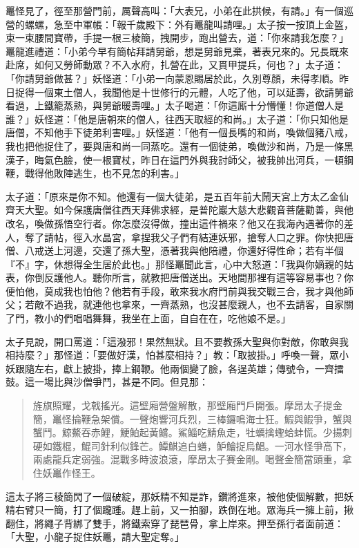 鼉怪見了，徑至那營門前，厲聲高叫：「大表兄，小弟在此拱候，有請。」有一個巡營的螺螺，急至中軍帳：「報千歲殿下：外有鼉龍叫請哩。」太子按一按頂上金盔，束一束腰間寶帶，手提一根三棱簡，拽開步，跑出營去，道：「你來請我怎麼？」鼉龍進禮道：「小弟今早有簡帖拜請舅爺，想是舅爺見棄，著表兄來的。兄長既來赴席，如何又勞師動眾？不入水府，扎營在此，又貫甲提兵，何也？」太子道：「你請舅爺做甚？」妖怪道：「小弟一向蒙恩賜居於此，久別尊顏，未得孝順。昨日捉得一個東土僧人，我聞他是十世修行的元體，人吃了他，可以延壽，欲請舅爺看過，上鐵籠蒸熟，與舅爺暖壽哩。」太子喝道：「你這廝十分懵懂！你道僧人是誰？」妖怪道：「他是唐朝來的僧人，往西天取經的和尚。」太子道：「你只知他是唐僧，不知他手下徒弟利害哩。」妖怪道：「他有一個長嘴的和尚，喚做個豬八戒，我也把他捉住了，要與唐和尚一同蒸吃。還有一個徒弟，喚做沙和尚，乃是一條黑漢子，晦氣色臉，使一根寶杖，昨日在這門外與我討師父，被我帥出河兵，一頓鋼鞭，戰得他敗陣逃生，也不見怎的利害。」

太子道：「原來是你不知。他還有一個大徒弟，是五百年前大鬧天宮上方太乙金仙齊天大聖。如今保護唐僧往西天拜佛求經，是普陀巖大慈大悲觀音菩薩勸善，與他改名，喚做孫悟空行者。你怎麼沒得做，撞出這件禍來？他又在我海內遇著你的差人，奪了請帖，徑入水晶宮，拿捏我父子們有結連妖邪，搶奪人口之罪。你快把唐僧、八戒送上河邊，交還了孫大聖，憑著我與他陪禮，你還好得性命；若有半個『不』字，休想得全生居於此也。」那怪鼉聞此言，心中大怒道：「我與你嫡親的姑表，你倒反護他人。聽你所言，就教把唐僧送出。天地間那裡有這等容易事也？你便怕他，莫成我也怕他？他若有手段，敢來我水府門前與我交戰三合，我才與他師父；若敵不過我，就連他也拿來，一齊蒸熟，也沒甚麼親人，也不去請客，自家關了門，教小的們唱唱舞舞，我坐在上面，自自在在，吃他娘不是。」

太子見說，開口罵道：「這潑邪！果然無狀。且不要教孫大聖與你對敵，你敢與我相持麼？」那怪道：「要做好漢，怕甚麼相持？」教：「取披掛。」呼喚一聲，眾小妖跟隨左右，獻上披掛，捧上鋼鞭。他兩個變了臉，各逞英雄；傳號令，一齊擂鼓。這一場比與沙僧爭鬥，甚是不同。但見那：
\begin{quote}
旌旗照耀，戈戟搖光。這壁廂營盤解散，那壁廂門戶開張。摩昂太子提金簡，鼉怪掄鞭急架償。一聲炮響河兵烈，三棒鑼鳴海士狂。鰕與鰕爭，蟹與蟹鬥。鯨鰲吞赤鯉，鯁鮊起黃鱨。鯊鯔吃鯖魚走，牡蠣擒蟶蛤蚌慌。少揚刺硬如鐵棍，鯤司針利似鋒芒。鱏鯕追白蟮，魲鱠捉烏鯧。一河水怪爭高下，兩處龍兵定弱強。混戰多時波浪滾，摩昂太子賽金剛。喝聲金簡當頭重，拿住妖鼉作怪王。
\end{quote}

這太子將三稜簡閃了一個破綻，那妖精不知是詐，鑽將進來，被他使個解數，把妖精右臂只一簡，打了個躘踵。趕上前，又一拍腳，跌倒在地。眾海兵一擁上前，揪翻住，將繩子背綁了雙手，將鐵索穿了琵琶骨，拿上岸來。押至孫行者面前道：「大聖，小龍子捉住妖鼉，請大聖定奪。」

